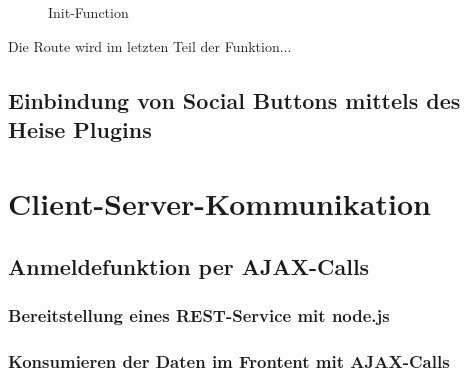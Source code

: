 \begin{figure}[!htbp]
	\caption{Init-Function}
	\label{fig:googleMapsInit2}
\end{figure}

Die Route wird im letzten Teil der Funktion...


\section{Einbindung von Social Buttons mittels des Heise Plugins}
\label{Einbindung von Social Buttons mittels des Heise Plugins}



\chapter{Client-Server-Kommunikation}
\label{Client-Server-Kommunikation}

\section{Anmeldefunktion per AJAX-Calls}
\label{Anmeldefunktion per AJAX-Calls}

\subsection{Bereitstellung eines REST-Service mit node.js}
\label{Bereitstellung eines REST-Service mit node.js}

\subsection{Konsumieren der Daten im Frontent mit AJAX-Calls}
\label{Konsumieren der Daten im Frontent mit AJAX-Calls}